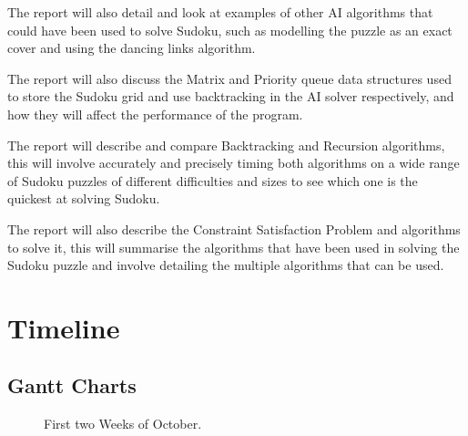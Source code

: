 \documentclass[]{final_report}
\begin{document}
The report will also detail and look at examples of other AI algorithms that could have been used to solve Sudoku, such as modelling the puzzle as an exact cover and using the dancing links algorithm.

The report will also discuss the Matrix and Priority queue data structures used to store the Sudoku grid and use backtracking in the AI solver respectively, and how they will affect the performance of the program.

The report will describe and compare Backtracking and Recursion algorithms, this will involve accurately and precisely timing both algorithms on a wide range of Sudoku puzzles of different difficulties and sizes to see which one is the quickest at solving Sudoku.

The report will also describe the Constraint Satisfaction Problem and algorithms to solve it, this will summarise the algorithms that have been used in solving the Sudoku puzzle and involve detailing the multiple algorithms that can be used.

\chapter*{Timeline}

\section*{Gantt Charts}

\begin{figure}[h]
	\centering
	\fboxsep 2mm
	\caption{\label{fig:October1} First two Weeks of October.}
\end{figure}
\end{document}
